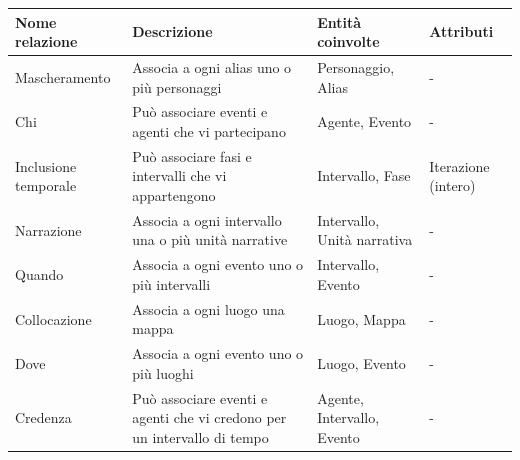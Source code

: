 \documentclass{article}
\begin{document}
\begin{center}\begin{tabular}{|p{}|p{}|p{}|p{}|}
		\hline
		\textbf{Nome relazione} & \textbf{Descrizione}                                                    & \textbf{Entità coinvolte}   & \textbf{Attributi}  \\
		\hline
		Mascheramento           & Associa a ogni alias uno o più personaggi                               & Personaggio, Alias          & -                   \\
		\hline
		Chi                     & Può associare eventi e agenti che vi partecipano                        & Agente, Evento              & -                   \\
		\hline
		Inclusione temporale    & Può associare fasi e intervalli che vi appartengono                     & Intervallo, Fase            & Iterazione (intero) \\
		\hline
		Narrazione              & Associa a ogni intervallo una o più unità narrative                     & Intervallo, Unità narrativa & -                   \\
		\hline
		Quando                  & Associa a ogni evento uno o più intervalli                              & Intervallo, Evento          & -                   \\
		\hline
		Collocazione            & Associa a ogni luogo una mappa                                          & Luogo, Mappa                & -                   \\
		\hline
		Dove                    & Associa a ogni evento uno o più luoghi                                  & Luogo, Evento               & -                   \\
		\hline
		Credenza                & Può associare eventi e agenti che vi credono per un intervallo di tempo & Agente, Intervallo, Evento  & -                   \\
		\hline
	\end{tabular}\end{center}

\pagebreak
\end{document}
